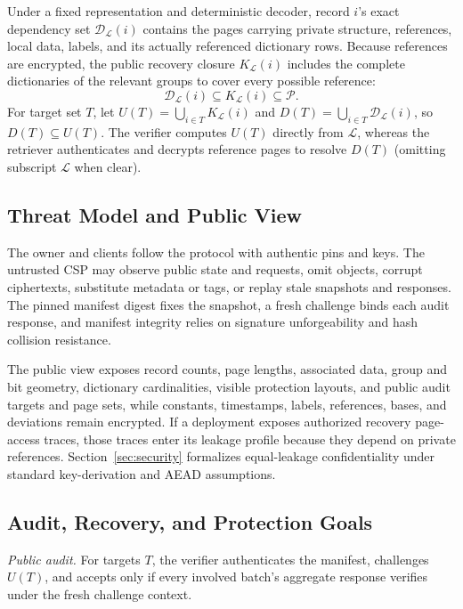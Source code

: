 \documentclass[10pt,journal]{IEEEtran}
\begin{document}
Under a fixed representation and deterministic decoder, record $i$'s exact dependency set $\mathcal D_{\mathcal L}(i)$ contains the pages carrying private structure, references, local data, labels, and its actually referenced dictionary rows. Because references are encrypted, the public recovery closure $K_{\mathcal L}(i)$ includes the complete dictionaries of the relevant groups to cover every possible reference:
\begin{equation}\label{eq:sufficient-set}
\mathcal D_{\mathcal L}(i)\subseteq K_{\mathcal L}(i)\subseteq\mathcal P.
\end{equation}
For target set $T$, let $U(T)=\bigcup_{i\in T}K_{\mathcal L}(i)$ and $D(T)=\bigcup_{i\in T}\mathcal D_{\mathcal L}(i)$, so $D(T)\subseteq U(T)$. The verifier computes $U(T)$ directly from $\mathcal L$, whereas the retriever authenticates and decrypts reference pages to resolve $D(T)$ (omitting subscript $\mathcal L$ when clear).

\subsection{Threat Model and Public View}
The owner and clients follow the protocol with authentic pins and keys. The untrusted CSP may observe public state and requests, omit objects, corrupt ciphertexts, substitute metadata or tags, or replay stale snapshots and responses. The pinned manifest digest fixes the snapshot, a fresh challenge binds each audit response, and manifest integrity relies on signature unforgeability and hash collision resistance.

The public view exposes record counts, page lengths, associated data, group and bit geometry, dictionary cardinalities, visible protection layouts, and public audit targets and page sets, while constants, timestamps, labels, references, bases, and deviations remain encrypted. If a deployment exposes authorized recovery page-access traces, those traces enter its leakage profile because they depend on private references. Section~\ref{sec:security} formalizes equal-leakage confidentiality under standard key-derivation and AEAD assumptions.

\subsection{Audit, Recovery, and Protection Goals}
\emph{Public audit.} For targets $T$, the verifier authenticates the manifest, challenges $U(T)$, and accepts only if every involved batch's aggregate response verifies under the fresh challenge context.
\end{document}
